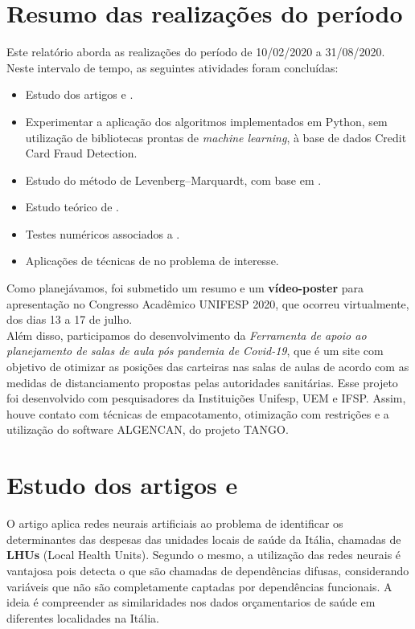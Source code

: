 \documentclass[11pt]{article}
\begin{document}
\section*{Resumo das realizações do período}
Este relatório aborda as realizações do período de 10/02/2020 a 31/08/2020. Neste intervalo de tempo, as seguintes atividades foram concluídas:

\begin{itemize}
\item Estudo dos artigos \cite{fraudeItalia1} e \cite{fraudeItalia2}.
\item Experimentar a aplicação dos algoritmos implementados em Python, sem utilização de bibliotecas prontas de \textit{machine learning}, à base de dados Credit Card Fraud Detection.

\item Estudo do método de Levenberg–Marquardt, com base em \cite{TCCKleber}.
\item Estudo teórico de \cite{bmLS}. 
\item Testes numéricos associados a \cite{bmLS}.
\item Aplicações de técnicas de \cite{bmLS} no problema de interesse.
\end{itemize}

\noindent
Como planejávamos, foi submetido um resumo e um \textbf{vídeo-poster} para apresentação no Congresso Acadêmico UNIFESP 2020, que ocorreu virtualmente, dos dias 13 a 17 de julho.\\

\noindent
Além disso, participamos do desenvolvimento da \textit{Ferramenta de apoio ao planejamento de salas de aula pós pandemia de Covid-19}, que é um site com objetivo de otimizar as posições das carteiras nas salas de aulas de acordo com as medidas de distanciamento propostas pelas autoridades sanitárias. Esse projeto foi desenvolvido com pesquisadores da Instituições Unifesp, UEM e IFSP. Assim, houve contato com técnicas de empacotamento, otimização com restrições e a utilização do software ALGENCAN, do projeto TANGO\supercite{TANGO}.
\section{Estudo dos artigos \cite{fraudeItalia1} e \cite{fraudeItalia2}}
O artigo \cite{fraudeItalia1} aplica redes neurais artificiais ao problema de identificar os determinantes das despesas das unidades locais de saúde da Itália, chamadas de \textbf{LHUs} (Local Health Units). Segundo o mesmo, a utilização das redes neurais é vantajosa pois detecta o que são chamadas de dependências difusas, considerando variáveis que não são completamente captadas por dependências funcionais. A ideia é compreender as similaridades nos dados orçamentarios de saúde em diferentes localidades na Itália.\\
\end{document}
